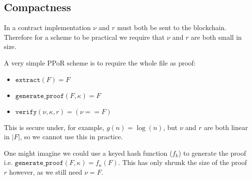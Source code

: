 \documentclass[12pt,a4paper,twoside,openright]{report}
\begin{document}


\subsection{Compactness}

In a contract implementation $\nu$ and $r$ must both be sent to the blockchain.
Therefore for a scheme to be practical we require that $\nu$ and $r$ are both small in size.


A very simple PPoR scheme is to require the whole file as proof:
\begin{itemize}
\item $\texttt{extract}(F) = F$

\item $\texttt{generate\_proof}(F, \kappa) = F$

\item $\texttt{verify}(\nu, \kappa, r) = (\nu == F)$
\end{itemize}
This is secure under, for example, $g(n) = \log(n)$, but $\nu$ and $r$ are both linear in $|F|$,
so we cannot use this in practice.


One might imagine we could use a keyed hash function ($f_k$) to generate the proof
i.e. $\texttt{generate\_proof}(F, \kappa) = f_\kappa(F)$.
This has only shrunk the size of the proof $r$ however, as we still need $\nu  = F$.


%
%
%
%
\end{document}
